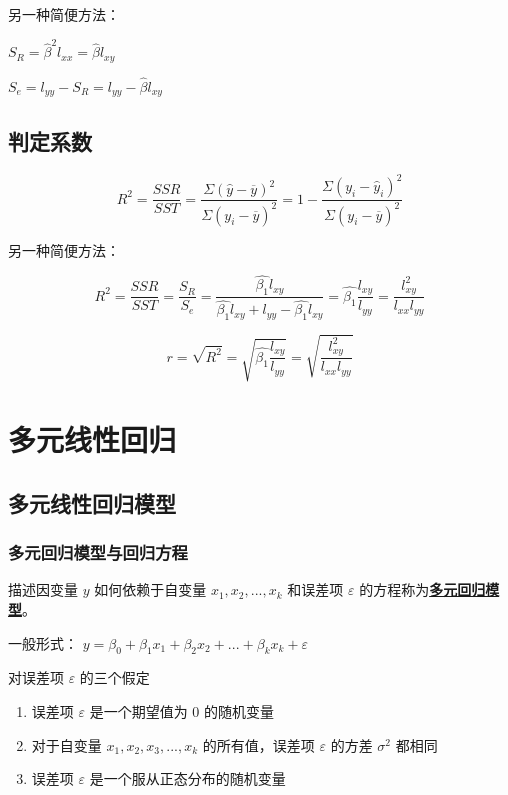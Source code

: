 \documentclass[UTF8,10pt]{book}
\begin{document}
{另一种简便方法：

\( S_R = \hat{\beta}^2 l_{xx}=\hat{\beta}l_{xy} \)

\( S_e = l_{yy} - S_R = l_{yy}-\hat{\beta}l_{xy} \)

\subsection{判定系数}\label{header-n124}

\[R^2 = \frac{SSR}{SST}=\frac{\Sigma(\hat{y}-\overline{y})^2}{\Sigma(y_i-\overline{y})^2} = 1 - \frac{\Sigma(y_i - \hat{y}_i)^2}{\Sigma(y_i-\overline{y})^2}\]

另一种简便方法：

\[R^2 = \frac{SSR}{SST}= \frac{S_R}{S_e} = \frac{\hat{\beta_1}  l_{xy}}{\hat{\beta_1}  l_{xy}+l_{yy}- \hat{\beta_1} l_{xy}}=\hat{\beta_1} \frac{l_{xy}}{l_{yy}} = \frac{l^2_{x y} }{l_{ x x } l_{y y}} \]

\[r = \sqrt{R^2}=\sqrt{\hat{\beta_1} \frac{l_{xy}}{l_{yy}}} = \sqrt{ \frac{l^2_{x y} }{l_{ x x } l_{y y}}}\]

\section{多元线性回归}\label{header-n133}

\subsection{多元线性回归模型}\label{header-n134}

\subsubsection{多元回归模型与回归方程}\label{header-n136}

描述因变量 \(y\) 如何依赖于自变量 \(x_1,x_2,...,x_k\) 和误差项
\(\varepsilon\) 的方程称为\textbf{\underline{多元回归模型}}。

一般形式：
\( y = \beta_0 + \beta_1 x_1 + \beta_2 x_2 + ... + \beta_k x_k + \varepsilon \)

对误差项 \(\varepsilon\) 的三个假定

\begin{enumerate}
	\def\labelenumi{\arabic{enumi}.}
	\item
	误差项 \(\varepsilon\) 是一个期望值为 \(0\) 的随机变量
	\item
	对于自变量 \( x_1, x_2 , x_3 , ... ,x_k \) 的所有值，误差项
	\(\varepsilon\) 的方差 \( \sigma^2 \) 都相同
	\item
	误差项 \(\varepsilon\) 是一个服从正态分布的随机变量
\end{enumerate}

}
\end{document}
